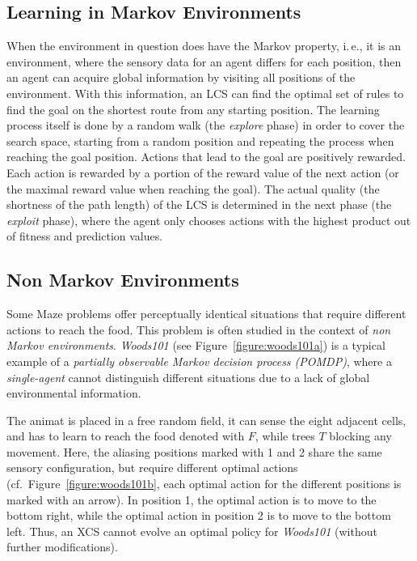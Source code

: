 \subsection{Learning in Markov Environments} %
\label{subsection:learning-markov}

When the environment in question does have the Markov property, i.\,e., it is an environment, where the sensory data for an agent differs for each position, then an agent can acquire global information by visiting all positions of the environment. With this information, an LCS can find the optimal set of rules to find the goal on the shortest route from any starting position. The learning process itself is done by a random walk (the \emph{explore} phase) in order to cover the search space, starting from a random position and repeating the process when reaching the goal position. Actions that lead to the goal are positively rewarded. Each action is rewarded by a portion of the reward value of the next action (or the maximal reward value when reaching the goal). The actual quality (the shortness of the path length) of the LCS is determined in the next phase (the \emph{exploit} phase), where the agent only chooses actions with the highest product out of fitness and prediction values.

\subsection{Non Markov Environments}
\label{subsection:non-markov-environments}

Some Maze problems offer perceptually identical situations that require different actions to reach the food. This problem is often studied in the context of \emph{non Markov environments}. \emph{Woods101} (see Figure~\ref{figure:woods101a}) is a typical example of a \emph{partially observable Markov decision process (POMDP)}, where a \emph{single-agent} cannot distinguish different situations due to a lack of global environmental information. 

The animat is placed in a free random field, it can sense the eight adjacent cells, and has to learn to reach the food denoted with $F$, while trees $T$ blocking any movement. Here, the aliasing positions marked with 1 and 2 share the same sensory configuration, but require different optimal actions (cf.\ Figure~\ref{figure:woods101b}, each optimal action for the different positions is marked with an arrow). In position 1, the optimal action is to move to the bottom right, while the optimal action in position 2 is to move to the bottom left. Thus, an XCS cannot evolve an optimal policy for \emph{Woods101} (without further modifications).

